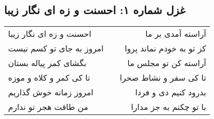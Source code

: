\begin{center}
\section*{غزل شماره ۱: احسنت و زه ای نگار زیبا}
\label{sec:001}
\begin{longtable}{l p{0.5cm} r}
احسنت و زه ای نگار زیبا
&&
آراسته آمدی بر ما
\\
امروز به جای تو کسم نیست
&&
کز تو به خودم نماند پروا
\\
بگشای کمر پیاله بستان
&&
آراسته کن تو مجلس ما
\\
تا کی کمر و کلاه و موزه
&&
تا کی سفر و نشاط صحرا
\\
امروز زمانه خوش گذاریم
&&
بدرود کنیم دی و فردا
\\
من طاقت هجر تو ندارم
&&
با تو چکنم به جز مدارا
\\
\end{longtable}
\end{center}
